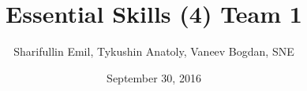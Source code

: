 \documentclass[a4paper]{article}
\begin{document}
\title{Essential Skills (4) Team 1}
\author{Sharifullin Emil,  Tykushin Anatoly, Vaneev Bogdan, SNE }
\date{September 30, 2016}

\maketitle
\tableofcontents
\listoffigures
\listoftables
\newpage






\end{document}
